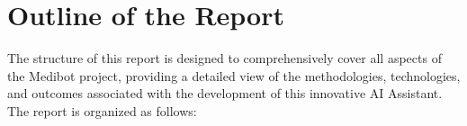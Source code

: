 \section{Outline of the Report}
The structure of this report is designed to comprehensively cover all aspects of the Medibot project, providing a detailed view of the methodologies, technologies, and outcomes associated with the development of this innovative AI Assistant. The report is organized as follows:


